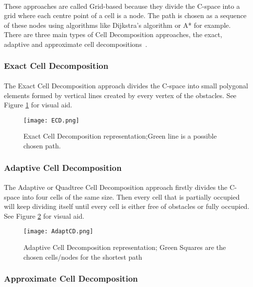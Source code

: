 \paragraph{}These approaches are called Grid-based because they divide the C-space into a grid where each centre point of a cell is a node. 
The path is chosen as a sequence of these  nodes using algorithms like Dijkstra’s algorithm or A* for example.
There are three main types of Cell Decomposition approaches, the exact, adaptive and approximate cell decompositions~\cite{PATLE2019582}. 
\subsubsection{Exact Cell Decomposition}
\label{subsubsec:ECD}
\paragraph{}The Exact Cell Decomposition approach divides the C-space into small polygonal elements formed by vertical lines created by every vertex of the obstacles. 
See Figure \ref{fig:ExactCellDecomposition} for visual aid.
\begin{figure}[H]
    \centering
    \texttt{[image: ECD.png]}
    \caption{Exact Cell Decomposition representation;Green line is a possible chosen path.}
    \label{fig:ExactCellDecomposition}
\end{figure}
\subsubsection{Adaptive Cell Decomposition}
\label{subsubsec:AdaptCD}
\paragraph{}The Adaptive or Quadtree Cell Decomposition approach firstly divides the C-space into four cells of the same size. Then every cell that is partially occupied will 
keep dividing itself until every cell is either free of obstacles or fully occupied. See Figure \ref{fig:AdaptiveCellDecomposition} for visual aid.
\begin{figure}[H]
    \centering
    \texttt{[image: AdaptCD.png]}
    \caption{Adaptive Cell Decomposition representation; Green Squares are the chosen cells/nodes for the shortest path}
    \label{fig:AdaptiveCellDecomposition}
\end{figure}
\subsubsection{Approximate Cell Decomposition}
\label{subsubsec:ApproxCD}
